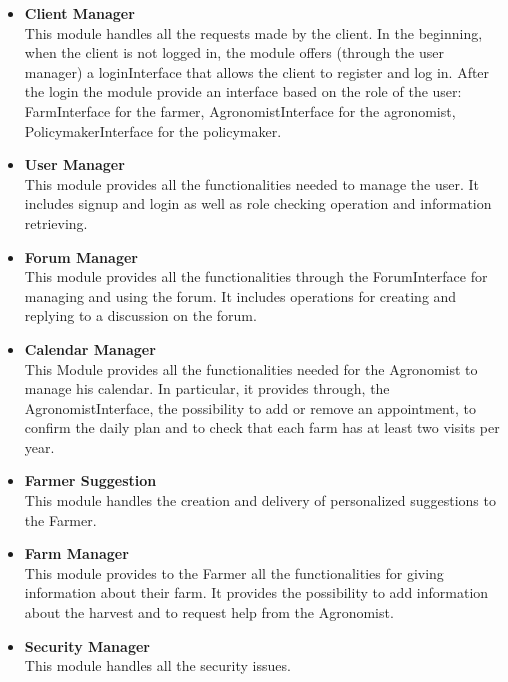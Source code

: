 \begin{itemize}
    \item \textbf{Client Manager}\\
        This module handles all the requests made by the client. In the beginning,
        when the client is not logged in, the module offers (through
        the user manager) a loginInterface that allows the client to register and log in. After the login the module
        provide an interface based on the role of the user: FarmInterface for the farmer, AgronomistInterface for the agronomist,
        PolicymakerInterface for the policymaker.

    \item \textbf{User Manager}\\
        This module provides all the functionalities needed to manage the user. It includes signup and login as well as role checking 
        operation and information retrieving.
           
    \item \textbf{Forum Manager}\\
        This module provides all the functionalities through the ForumInterface for managing and using the forum. 
        It includes operations for creating and replying to a discussion on the forum.

    \item \textbf{Calendar Manager}\\
        This Module provides all the functionalities needed for the Agronomist to manage his calendar. In particular, it provides
        through, the AgronomistInterface, the possibility to add or remove an appointment, to confirm the daily plan and to check
        that each farm has at least two visits per year.

    \item \textbf{Farmer Suggestion}\\
        This module handles the creation and delivery of personalized suggestions to the Farmer. 

    \item \textbf{Farm Manager}\\
        This module provides to the Farmer all the functionalities for giving information about their farm. 
        It provides the possibility to add information about the harvest and to request help from the Agronomist.

    \item \textbf{Security Manager}\\
        This module handles all the security issues.
\end{itemize}

